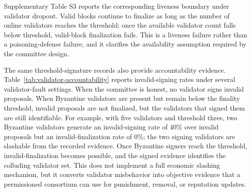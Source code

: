 \documentclass[preprint,12pt]{elsarticle}
\begin{document}
\begin{table}[t]
\centering
\caption{Byzantine-validator boundary for threshold finality. Values are means over 13 representative runs; higher invalid acceptance indicates threshold compromise.}
\label{tab:byzantine-boundary}
\end{table}

Supplementary Table S3 reports the corresponding liveness boundary under validator dropout. Valid blocks continue to finalize as long as the number of online validators reaches the threshold; once the available validator count falls below threshold, valid-block finalization fails. This is a liveness failure rather than a poisoning-defense failure, and it clarifies the availability assumption required by the committee design.

The same threshold-signature records also provide accountability evidence. Table~\ref{tab:validator-accountability} reports invalid-signing rates under several validator-fault settings. When the committee is honest, no validator signs invalid proposals. When Byzantine validators are present but remain below the finality threshold, invalid proposals are not finalized, but the validators that signed them are still identifiable. For example, with five validators and threshold three, two Byzantine validators generate an invalid-signing rate of 40\% over invalid proposals but an invalid-finalization rate of 0\%; the two signing validators are slashable from the recorded evidence. Once Byzantine signers reach the threshold, invalid-finalization becomes possible, and the signed evidence identifies the colluding validator set. This does not implement a full economic slashing mechanism, but it converts validator misbehavior into objective evidence that a permissioned consortium can use for punishment, removal, or reputation updates.
\end{document}

